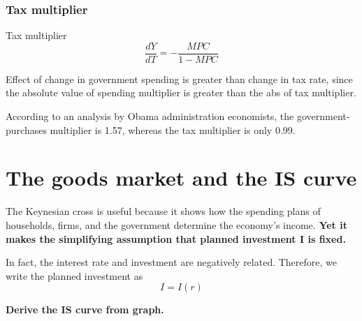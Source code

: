 \documentclass[10pt]{article}
\begin{document}
\subsubsection{Tax multiplier}
Tax multiplier
\begin{equation*}
\frac{dY}{dT} = -\frac{MPC}{1 - MPC}
\end{equation*}




Effect of change in government spending is greater than change in tax rate, since
the absolute value of spending multiplier is greater than the abs of tax multiplier.

According to an analysis by Obama administration economists, the government-purchases multiplier is 1.57, whereas the tax multiplier is only 0.99.





\section{The goods market and the IS curve}
The Keynesian cross is useful because it shows how the spending plans of households, firms, and the government determine the economy’s income. {\textbf {Yet it makes the simplifying assumption that planned investment I is fixed.}}


In fact, the interest rate and investment are negatively related. Therefore, we write
the planned investment as
\begin{equation*}
I = I(r)
\end{equation*}


{\textbf {Derive the IS curve from graph.}}

\begin{figure}[H]
\end{figure}
\end{document}
